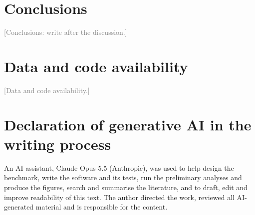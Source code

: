 \documentclass[preprint,12pt,authoryear]{elsarticle}
\newcommand{\towrite}[1]{\textcolor{gray}{[#1]}}
\begin{document}
\section{Conclusions}
\label{sec:conclusions}

\towrite{Conclusions: write after the discussion.}

\section*{Data and code availability}
\towrite{Data and code availability.}

\section*{Declaration of generative AI in the writing process}

An AI assistant, Claude Opus 5.5 (Anthropic), was used to help design the benchmark, write the software and its tests, run the preliminary analyses and produce the figures, search and summarise the literature, and to draft, edit and improve readability of this text. The author directed the work, reviewed all AI-generated material and is responsible for the content.



\end{document}
